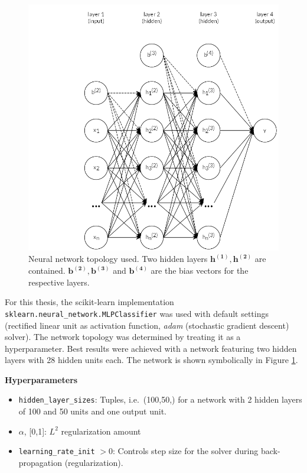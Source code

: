 \documentclass[
  11pt,
  a4paper,
  DIV=12,captions=tableheading,oneside,titlepage]{scrbook}
\providecommand{\tightlist}{%
  \setlength{\itemsep}{0pt}\setlength{\parskip}{0pt}}
\begin{document}
\begin{figure}

{\centering \includegraphics[width=0.7\linewidth]{figures/methods/mlp-structure} 

}

\caption{Neural network topology used. Two hidden layers \(\mathbf{h^{(1)}, h^{(2)}}\) are contained. \(\mathbf{b^{(2)}, b^{(3)}}\) and \(\mathbf{b^{(4)}}\) are the bias vectors for the respective layers.}\label{fig:mlp-graph}
\end{figure}

For this thesis, the scikit-learn implementation \texttt{sklearn.neural\_network.MLPClassifier} was used with default settings (rectified linear unit as activation function, \emph{adam} (stochastic gradient descent) solver). The network topology was determined by treating it as a hyperparameter. Best results were achieved with a network featuring two hidden layers with 28 hidden units each. The network is shown symbolically in Figure \ref{fig:mlp-graph}.

\textbf{Hyperparameters}

\begin{itemize}
\tightlist
\item
  \texttt{hidden\_layer\_sizes}: Tuples, i.e.~(100,50,) for a network with 2 hidden layers of 100 and 50 units and one output unit.
\item
  \(\alpha\), {[}0,1{]}: \(L^2\) regularization amount
\item
  \texttt{learning\_rate\_init} \(>0\): Controls step size for the solver during back-propagation (regularization).
\end{itemize}
\end{document}
